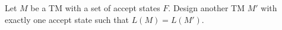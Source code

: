 Let $M$ be a TM with a set of accept states $F$.
Design another TM $M'$ with exactly one accept state such that
$L(M) = L(M')$.
